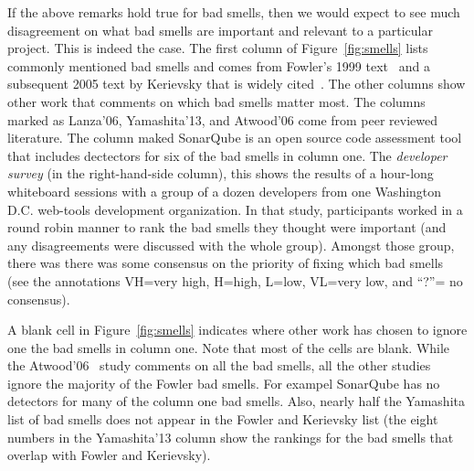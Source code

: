\documentclass{sig-alternate}
\newcommand{\fig}[1]{Figure~\ref{fig:#1}}
\begin{document}
If the above remarks hold true for bad smells, then we would expect
to see much disagreement on what bad smells are important and relevant
to  a particular project. This is indeed the case.
The first column of \fig{smells} 
lists  commonly mentioned bad smells and comes from Fowler's 1999 text~\cite{Fowler99} and a subsequent 2005 text by Kerievsky that is widely cited~\cite{Kerievsky2005}.
The other
columns show other work that comments on which bad smells matter most.
The columns marked as Lanza'06, Yamashita'13, and Atwood'06 come from
peer reviewed literature. The column maked SonarQube is an open source
code assessment tool that includes dectectors for six of the bad smells
in column one. 
The {\em developer survey}   (in the right-hand-side column),
   this shows the results of a hour-long whiteboard sessions with a group of a
 dozen developers from one Washington
    D.C. web-tools development organization. In that study, participants
    worked in a round robin manner to rank the bad smells they thought were
    important (and any disagreements were discussed with the whole group).
     Amongst those group, there was there was  some
    consensus on  the priority of fixing which  bad smells   
    (see the annotations VH=very high,
    H=high, L=low, VL=very low, and ``?''= no consensus).  
   
   
   


A  blank cell in \fig{smells}
indicates where   other work has chosen to ignore
one the   bad smells in column one. 
Note that most of the cells are blank.
While the Atwood'06~\cite{Atwood06} study  comments on   
all the   bad smells,
all the  other  studies ignore the majority of the Fowler bad smells.
For exampel SonarQube has no detectors for many of the column one bad smells.
Also, nearly half the Yamashita list of bad smells
    does not appear in the Fowler and Kerievsky list
    (the eight numbers
    in the  Yamashita'13 column show the rankings for the bad smells 
    that overlap with Fowler and Kerievsky).
    
\end{document}
